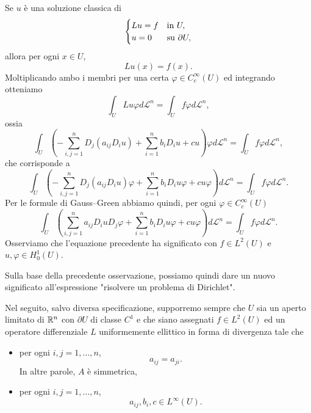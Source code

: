 Se $u$ è una soluzione classica di
\[ \begin{cases}
	Lu = f & \textup{in } U,\\
	u = 0 & \textup{su } \partial U,
\end{cases} \]
allora per ogni $x \in U$,
\[ Lu(x) = f(x). \]
Moltiplicando ambo i membri per una certa $\varphi \in C^\infty_c(U)$ ed integrando otteniamo 
\[ \int_U L u \varphi d\mathcal{L}^n = \int_U f \varphi d\mathcal{L}^n, \]
ossia
\[ \int_U \left( -\sum_{i,j=1}^{n}D_{j}(a_{ij}D_iu) + \sum_{i=1}^{n}b_i D_iu + cu\right)  \varphi d\mathcal{L}^n = \int_U f \varphi d\mathcal{L}^n, \]
che corrisponde a 
\[ \int_U \left( -\sum_{i,j=1}^{n}D_{j}(a_{ij}D_iu)\varphi + \sum_{i=1}^{n}b_i D_iu\varphi + cu\varphi\right) d\mathcal{L}^n = \int_U f \varphi d\mathcal{L}^n. \]
Per le formule di Gauss--Green abbiamo quindi, per ogni $\varphi \in C^\infty_c(U)$
\[ \int_U \left( \sum_{i,j=1}^{n}a_{ij}D_iuD_{j}\varphi + \sum_{i=1}^{n}b_i D_iu\varphi + cu\varphi\right) d\mathcal{L}^n = \int_U f \varphi d\mathcal{L}^n. \]
Osserviamo che l'equazione precedente ha significato con $f \in L^2(U)$ e $u,\varphi \in H^1_0(U)$.

Sulla base della precedente osservazione, possiamo quindi dare un nuovo significato all'espressione "risolvere un problema di Dirichlet".

Nel seguito, salvo diversa specificazione, supporremo sempre che $U$ sia un aperto limitato di $\mathbb{R}^n$ con $\partial U$ di classe $C^1$ e che siano assegnati $f \in L^2(U)$ ed un operatore differenziale $L$ uniformemente ellittico in forma di divergenza tale che
\begin{itemize}
	\item per ogni $i,j = 1,\dots, n$, 
	\[ a_{ij}=a_{ji}. \]
	In altre parole, $A$ è simmetrica,
	\item per ogni $i,j = 1,\dots, n$, 
	\[ a_{ij},b_i,c \in L^\infty(U). \]
\end{itemize}

